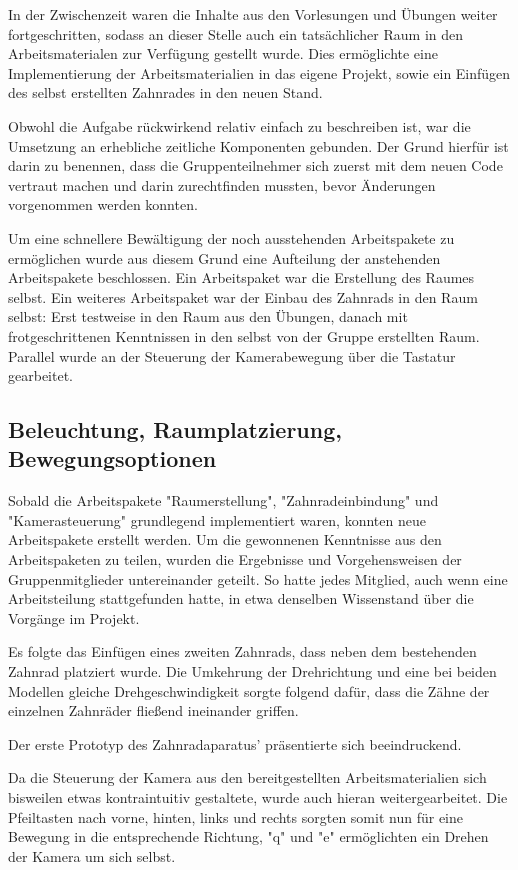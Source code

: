 \documentclass{article}
\begin{document}
In der Zwischenzeit waren die Inhalte aus den Vorlesungen und Übungen weiter fortgeschritten, sodass an dieser Stelle auch ein tatsächlicher Raum in den Arbeitsmaterialen zur Verfügung gestellt wurde. 
Dies ermöglichte eine Implementierung der Arbeitsmaterialien in das eigene Projekt, sowie ein Einfügen des selbst erstellten Zahnrades in den neuen Stand. 

Obwohl die Aufgabe rückwirkend relativ einfach zu beschreiben ist, war die Umsetzung an erhebliche zeitliche Komponenten gebunden. 
Der Grund hierfür ist darin zu benennen, dass die Gruppenteilnehmer sich zuerst mit dem neuen Code vertraut machen und darin zurechtfinden mussten, bevor Änderungen vorgenommen werden konnten. 

Um eine schnellere Bewältigung der noch ausstehenden Arbeitspakete zu ermöglichen wurde aus diesem Grund eine Aufteilung der anstehenden Arbeitspakete beschlossen. 
Ein Arbeitspaket war die Erstellung des Raumes selbst. 
Ein weiteres Arbeitspaket war der Einbau des Zahnrads in den Raum selbst: 
Erst testweise in den Raum aus den Übungen, danach mit frotgeschrittenen Kenntnissen in den selbst von der Gruppe erstellten Raum. 
Parallel wurde an der Steuerung der Kamerabewegung über die Tastatur gearbeitet. 



\subsection{Beleuchtung, Raumplatzierung, Bewegungsoptionen}
Sobald die Arbeitspakete "Raumerstellung", "Zahnradeinbindung" und "Kamerasteuerung" grundlegend implementiert waren, konnten neue Arbeitspakete erstellt werden. 
Um die gewonnenen Kenntnisse aus den Arbeitspaketen zu teilen, wurden die Ergebnisse und Vorgehensweisen der Gruppenmitglieder untereinander geteilt. 
So hatte jedes Mitglied, auch wenn eine Arbeitsteilung stattgefunden hatte, in etwa denselben Wissenstand über die Vorgänge im Projekt. 

Es folgte das Einfügen eines zweiten Zahnrads, dass neben dem bestehenden Zahnrad platziert wurde. Die Umkehrung der Drehrichtung und eine bei beiden Modellen gleiche Drehgeschwindigkeit sorgte folgend dafür, dass die Zähne der einzelnen Zahnräder fließend ineinander griffen. 

Der erste Prototyp des Zahnradaparatus' präsentierte sich beeindruckend. 

Da die Steuerung der Kamera aus den bereitgestellten Arbeitsmaterialien sich bisweilen etwas kontraintuitiv gestaltete, wurde auch hieran weitergearbeitet. 
Die Pfeiltasten nach vorne, hinten, links und rechts sorgten somit nun für eine Bewegung in die entsprechende Richtung, "q" und "e" ermöglichten ein Drehen der Kamera um sich selbst. 
\end{document}
